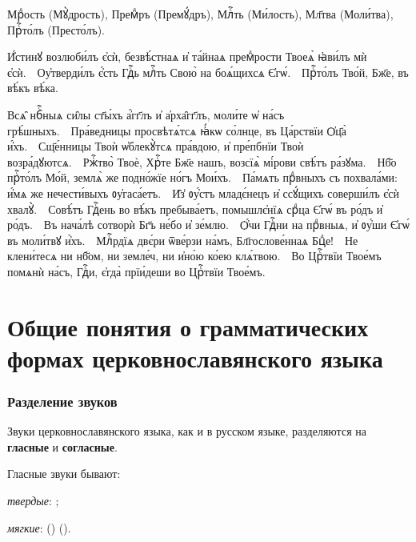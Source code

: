 \documentclass[11pt,a4paper,oneside]{memoir}
\begin{document}
    \begin{slv}
        Мрⷣость (Мꙋ̀дрость), Премⷣръ (Премꙋ́дръ), Млⷭ҇ть (Ми́лость), Мл҃тва (Моли́тва), Прⷭ҇то́лъ (Престо́лъ).
        
        И҆́стинꙋ возлюби́лъ є҆сѝ, безвѣ́стнаѧ и҆ та́йнаѧ премⷣрости Твоеѧ̀ ꙗ҆ви́лъ мѝ є҆сѝ.~\textemdash~Оу҆тверди́лъ є҆́сть Гдⷭ҇ь млⷭ҇ть Свою̀ на боѧ́щихсѧ Є҆гѡ́.~\textemdash~Прⷭ҇то́лъ Тво́й, Бж҃е, въ вѣ́къ вѣ́ка.
        
        Всѧ̑ нбⷭ҇ныѧ си̑лы ст҃ы́хъ а҆́гг҃лъ и҆ а҆рха̑гг҃лъ, моли́те ѡ҆ на́съ грѣ́шныхъ.~\textemdash~Пра́ведницы просвѣтѧ́тсѧ ꙗ҆́кѡ со́лнце, въ Ца́рствїи Ѻ҆ц҃а̀ и҆́хъ.~\textemdash~Сщ҃е́нницы Твоѝ ѡ҆блекꙋ̀тсѧ пра́вдою, и҆ пре́пбнїи Твоѝ возра́дꙋютсѧ.~\textemdash~Ржⷭ҇тво̀ Твоѐ, Хрⷭ҇те Бж҃е нашъ, возсїѧ̀ мі́рови свѣ́тъ ра́зꙋма.~\textemdash~Нб҃о прⷭ҇то́лъ Мо́й, землѧ̀ же подно́жїе но́гъ Мои́хъ.~\textemdash~Па́мѧть прⷣвныхъ съ похвала́ми: и҆́мѧ же нечести́выхъ ᲂу҆гаса́етъ.~\textemdash~И̑з̾ ᲂу҆́стъ младє́нецъ и҆ ссꙋ́щихъ соверши́лъ є҆сѝ хвалꙋ̀.~\textemdash~Совѣ́тъ Гдⷭ҇ень во вѣ́къ пребыва́етъ, помышлє҆нїѧ срⷣца Є҆гѡ́ въ ро́дъ и҆ ро́дъ.~\textemdash~Въ нача́лѣ сотворѝ Бг҃ъ не́бо и҆ зе́млю.~\textemdash~Ѻ҆́чи Гдⷭ҇ни на прⷣвныѧ, и҆ ᲂу҆́ши Є҆гѡ́ въ моли́твꙋ и҆̀хъ.~\textemdash~Млⷭ҇рдїѧ двє́ри ѿве́рзи на́мъ, Бл҃гослове́ннаѧ Бцⷣе!~\textemdash~Не клени́тесѧ ни нб҃ом, ни земле́ч, ни и҆но́ю ко́ею клѧ́твою.~\textemdash~Во Црⷭ҇твїи Твое́мъ помѧнѝ на́съ, Гдⷭ҇и, є҆гда̀ прїи́деши во Црⷭ҇твїи Твое́мъ.
    \end{slv}


        \section[Общие понятия о грамматических формах]{Общие понятия о грамматических формах церковнославянского языка}
                \subsubsection{Разделение звуков}

    \medskip
    Звуки церковнославянского языка, как и в русском языке, разделяются на \textbf{гласные} и \textbf{согласные}.
    \medskip
    
    Гласные звуки бывают:
    \medskip
    
    \emph{твердые}: {};

    \emph{мягкие}: {} ({}){} ({}){}.
    \medskip
    
\end{document}
